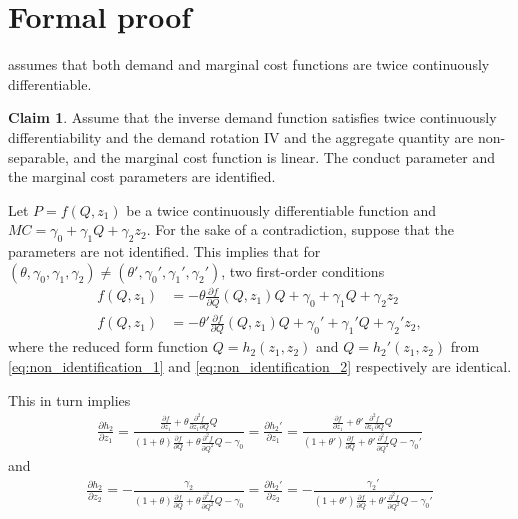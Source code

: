 \documentclass[11pt]{article}
\numberwithin{figure}{section}
\theoremstyle{definition}
\newcommand{\0}{\mathbf{0}}
\newtheorem{claim}{Claim}
\begin{document}
\section{Formal proof}
\citet{lau1982identifying} assumes that both demand and marginal cost functions are twice continuously differentiable.

\begin{claim}
Assume that the inverse demand function satisfies twice continuously differentiability and the demand rotation IV and the aggregate quantity are non-separable, and the marginal cost function is linear. The conduct parameter and the marginal cost parameters are identified.
\end{claim}

Let $P = f(Q,z_1)$ be a twice continuously differentiable function and $MC = \gamma_0 + \gamma_1 Q + \gamma_2 z_2$.
For the sake of a contradiction, suppose that the parameters are not identified. This implies that for $(\theta, \gamma_0, \gamma_1, \gamma_2)\ne (\theta', \gamma_0', \gamma_1', \gamma_2')$, two first-order conditions
\begin{align}
    f(Q,z_1) &= - \theta \frac{\partial f}{\partial Q}(Q,z_1) Q + \gamma_0 + \gamma_1 Q + \gamma_2 z_2 \label{eq:non_identification_1}\\
    f(Q,z_1) &= - \theta' \frac{\partial f}{\partial Q}(Q,z_1) Q + \gamma_0' + \gamma_1' Q + \gamma_2' z_2 \label{eq:non_identification_2},
\end{align}
where the reduced form function $Q= h_2(z_1,z_2)$ and $Q= h_2'(z_1,z_2)$ from \eqref{eq:non_identification_1} and \eqref{eq:non_identification_2} respectively are identical.





This in turn implies
\begin{align}\label{eq:equivalence_1}
    \frac{\partial h_2}{\partial z_1} = \frac{\frac{\partial f}{\partial z_1} + \theta \frac{\partial^2 f}{\partial z_1\partial Q}Q}{(1 + \theta)\frac{\partial f}{\partial Q} + \theta \frac{\partial^2 f}{\partial Q^2}Q - \gamma_0} = \frac{\partial h_2'}{\partial z_1} = \frac{\frac{\partial f}{\partial z_1} + \theta' \frac{\partial^2 f}{\partial z_1\partial Q}Q}{(1 + \theta')\frac{\partial f}{\partial Q} + \theta' \frac{\partial^2 f}{\partial Q^2}Q - \gamma_0'}
\end{align}
and 
\begin{align}\label{eq:equivalence_2}
    \frac{\partial h_2}{\partial z_2} = -\frac{\gamma_2}{(1 + \theta)\frac{\partial f}{\partial Q} + \theta \frac{\partial^2 f}{\partial Q^2}Q - \gamma_0} = \frac{\partial h_2'}{\partial z_2} = -\frac{\gamma_2'}{(1 + \theta')\frac{\partial f}{\partial Q} + \theta' \frac{\partial^2 f}{\partial Q^2}Q - \gamma_0'}
\end{align}
\end{document}
